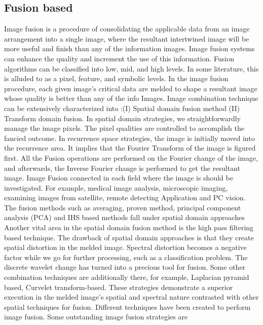 \documentclass[doctor,english,listoffigures,listoftables]{thesis-uestc}
\begin{document}
\subsection{Fusion based} 
Image fusion is a procedure of consolidating the applicable data from an image arrangement into a single image, where the resultant intertwined image will be more useful and finish than any of the information images. Image fusion systems can enhance the quality and increment the use of this information. Fusion algorithms can be classified into low, mid, and high levels. 
In some literature, this is alluded to as a pixel, feature, and symbolic levels. In the image fusion procedure, each given image's critical data are melded to shape a resultant image whose quality is better than any of the info Images. Image combination technique can be extensively characterized into :(I) Spatial domain fusion method (II) Transform domain fusion. In spatial domain strategies, we straightforwardly manage the image pixels. The pixel qualities are controlled to accomplish the fancied outcome. In recurrence space strategies, the image is initially moved into the recurrence area. It implies that the Fourier Transform of the image is figured first. All the Fusion operations are performed on the Fourier change of the image, and afterwards, the Inverse Fourier change is performed to get the resultant image. Image Fusion connected in each field where the image is should be investigated. For example, medical image analysis, microscopic imaging, examining images from satellite, remote detecting Application and PC vision. The fusion methods such as averaging, proven method, principal component analysis (PCA) and IHS based methods fall under spatial domain approaches
 Another vital area in the spatial domain fusion method is the high pass filtering based technique. The drawback of spatial domain approaches is that they create spatial distortion in the melded image. Spectral distortion becomes a negative factor while we go for further processing, such as a classification problem. The discrete wavelet change has turned into a precious tool for fusion. Some other combination techniques are additionally there, for example, Laplacian pyramid based, Curvelet transform-based. These strategies demonstrate a superior execution in the melded image's spatial and spectral nature contrasted with other spatial techniques for fusion. Different techniques have been created to perform image fusion. Some outstanding image fusion strategies are 
\end{document}
